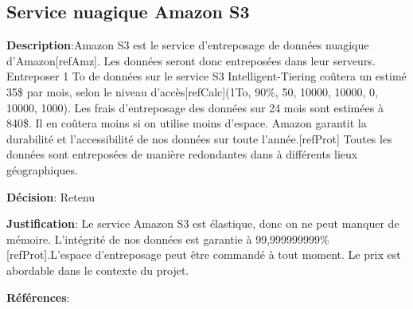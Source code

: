 

\subsection{Service nuagique Amazon S3}
\label{s:archiver_conc2}

\textbf{Description}:Amazon S3 est le service d'entreposage de données nuagique d’Amazon[refAmz]. Les données seront donc entreposées dans leur serveurs. Entreposer 1 To de données sur le service S3 Intelligent-Tiering coûtera un estimé 35\$ par mois, selon le niveau d’accès[refCalc](1To, 90\%, 50, 10000, 10000, 0, 10000, 1000).  Les frais d’entreposage des données sur 24 mois sont estimées à 840\$. Il en coûtera moins si on utilise moins d’espace. Amazon garantit la durabilité et l'accessibilité de nos données sur toute l’année.[refProt] Toutes les données sont entreposées de manière redondantes dans à différents lieux géographiques.

\textbf{Décision}: Retenu

\textbf{Justification}:  Le service Amazon S3 est élastique, donc on ne peut manquer de mémoire. L’intégrité de nos données est garantie à 99,999999999\%[refProt].L’espace d’entreposage peut être commandé à tout moment. Le prix est abordable dans le contexte du projet.

\textbf{Références}: 
\cite{amznS3, amznProt}
